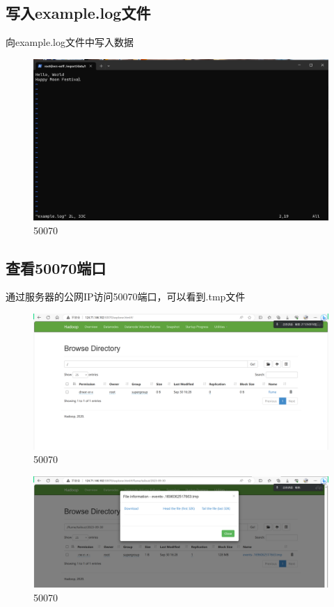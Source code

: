 \subsection{写入example.log文件}
向example.log文件中写入数据
\begin{figure}[H]
  \centering
  \includegraphics[width=\textwidth]{figure/image.png}
  \caption{50070}
  \label{fig:my_label}
\end{figure}

\subsection{查看50070端口}
通过服务器的公网IP访问50070端口，可以看到.tmp文件
\begin{figure}[H]
  \centering
  \includegraphics[width=\textwidth]{figure/50070.png}
  \caption{50070}
  \label{fig:my_label}
\end{figure}
\begin{figure}[H]
  \centering
  \includegraphics[width=\textwidth]{figure/文件.png}
  \caption{50070}
  \label{fig:my_label}
\end{figure}

